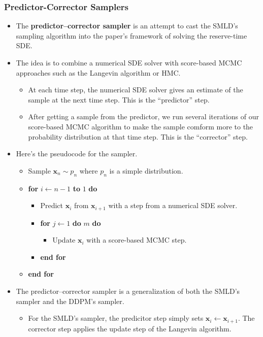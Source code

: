 \documentclass[10pt]{article}
\newcommand{\ve}[1]{\mathbf{#1}}
\begin{document}
\subsubsection{Predictor-Corrector Samplers}

\begin{itemize}
  \item The {\bf predictor--corrector sampler} is an attempt to cast the SMLD's sampling algorithm into the paper's framework of solving the reserve-time SDE.
  
  \item The idea is to combine a numerical SDE solver with score-based MCMC approaches such as the Langevin algorithm or HMC.
  \begin{itemize}
    \item At each time step, the numerical SDE solver gives an estimate of the sample at the next time step. This is the ``predictor'' step.
    
    \item After getting a sample from the predictor, we run several iterations of our score-based MCMC algorithm to make the sample comform more to the probability distribution at that time step. This is the ``corrector'' step.    
  \end{itemize}

  \item Here's the pseudocode for the sampler.
  \begin{itemize}
    \item[] Sample $\ve{x}_n \sim p_n$ where $p_n$ is a simple distribution.
    \item[] {\bf for} $i \gets n-1$ {\bf to} $1$ {\bf do}
    \begin{itemize}
      \item[] Predict $\ve{x}_{i}$ from $\ve{x}_{i+1}$ with a step from a numerical SDE solver.
      \item[] {\bf for} $j \gets 1$ {\bf do} $m$ {\bf do}
      \begin{itemize}
        \item[]  Update $\ve{x}_i$ with a score-based MCMC step.
      \end{itemize}
      \item[] {\bf end for}
    \end{itemize}
    \item[] {\bf end for}
  \end{itemize}

  \item The predictor--corrector sampler is a generalization of both the SMLD's sampler and the DDPM's sampler.
  \begin{itemize}
    \item For the SMLD's sampler, the predicitor step simply sets $\ve{x}_i \gets \ve{x}_{i+1}$. The corrector step applies the update step of the Langevin algorithm.
    

\end{itemize}
\end{itemize}
\end{document}
